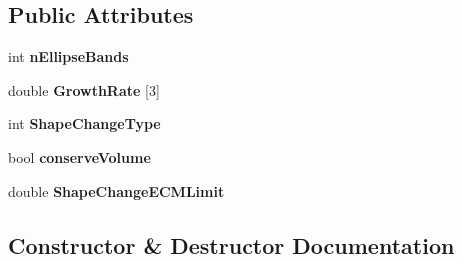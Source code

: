 \subsection*{Public Attributes}
\begin{DoxyCompactItemize}
\item 
\hypertarget{classmarkerEllipseBasedShapeChangeFunction_ad3a4295d10decba7cfedcfc346be4267}{}int {\bfseries n\+Ellipse\+Bands}\label{classmarkerEllipseBasedShapeChangeFunction_ad3a4295d10decba7cfedcfc346be4267}

\item 
\hypertarget{classmarkerEllipseBasedShapeChangeFunction_af629b3243c3e8042fc63da026f643f0b}{}double {\bfseries Growth\+Rate} \mbox{[}3\mbox{]}\label{classmarkerEllipseBasedShapeChangeFunction_af629b3243c3e8042fc63da026f643f0b}

\item 
\hypertarget{classmarkerEllipseBasedShapeChangeFunction_a0ddbc19f190dae22e370d26142d31472}{}int {\bfseries Shape\+Change\+Type}\label{classmarkerEllipseBasedShapeChangeFunction_a0ddbc19f190dae22e370d26142d31472}

\item 
\hypertarget{classmarkerEllipseBasedShapeChangeFunction_a3de1358ce2f62a683585fd9662672744}{}bool {\bfseries conserve\+Volume}\label{classmarkerEllipseBasedShapeChangeFunction_a3de1358ce2f62a683585fd9662672744}

\item 
\hypertarget{classmarkerEllipseBasedShapeChangeFunction_a95dbc4a53d1c4ddd4f896df7dc09525c}{}double {\bfseries Shape\+Change\+E\+C\+M\+Limit}\label{classmarkerEllipseBasedShapeChangeFunction_a95dbc4a53d1c4ddd4f896df7dc09525c}

\end{DoxyCompactItemize}


\subsection{Constructor \& Destructor Documentation}
\hypertarget{classmarkerEllipseBasedShapeChangeFunction_a672deb17c0ad66c4bc59aec927c48322}{}
